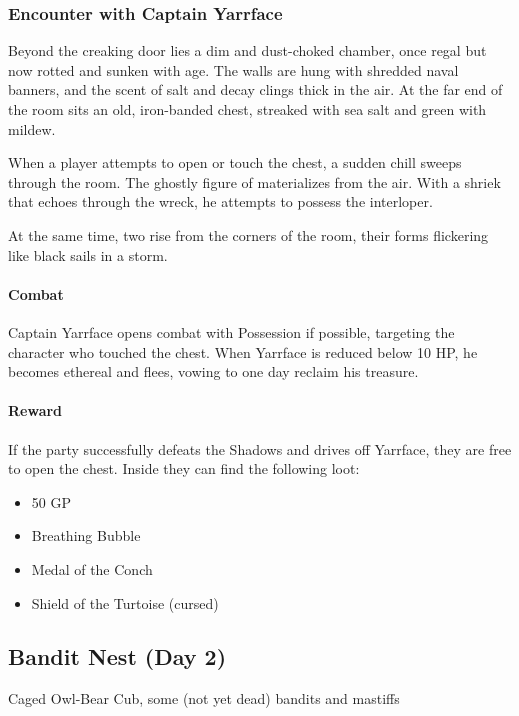 \subsubsection*{Encounter with Captain Yarrface}
{\entryfont Beyond the creaking door lies a dim and dust-choked chamber, once regal but now rotted and sunken with age. The walls are hung with shredded naval banners, and the scent of salt and decay clings thick in the air. At the far end of the room sits an old, iron-banded chest, streaked with sea salt and green with mildew.

When a player attempts to open or touch the chest, a sudden chill sweeps through the room. The ghostly figure of \hyperref[monster:CaptainYarrface]{} materializes from the air. With a shriek that echoes through the wreck, he attempts to possess the interloper.

At the same time, two \hyperref[monster:Shadow]{} rise from the corners of the room, their forms flickering like black sails in a storm.

\paragraph*{Combat} Captain Yarrface opens combat with Possession if possible, targeting the character who touched the chest. When Yarrface is reduced below 10 HP, he becomes ethereal and flees, vowing to one day reclaim his treasure.

\paragraph*{Reward} If the party successfully defeats the Shadows and drives off Yarrface, they are free to open the chest. Inside they can find the following loot:
\begin{itemize}
	\item 50 GP
	\item Breathing Bubble
	\item Medal of the Conch
	\item Shield of the Turtoise (cursed)
\end{itemize}
}

\subsection*{Bandit Nest (Day 2)}
Caged Owl-Bear Cub, some (not yet dead) bandits and mastiffs
